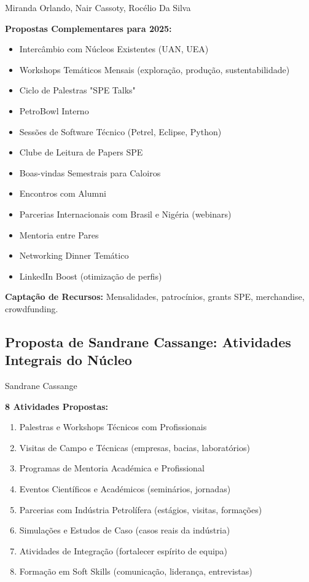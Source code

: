 \documentclass[12pt,a4paper,oneside]{article}
\begin{document}
\begin{proposalbox}{Miranda Orlando, Nair Cassoty, Rocélio Da Silva}

\textbf{Propostas Complementares para 2025:}

\begin{itemize}[label={\color{spe-secondary}▸}]
  \item Intercâmbio com Núcleos Existentes (UAN, UEA)
  \item Workshops Temáticos Mensais (exploração, produção, sustentabilidade)
  \item Ciclo de Palestras "SPE Talks"
  \item PetroBowl Interno
  \item Sessões de Software Técnico (Petrel, Eclipse, Python)
  \item Clube de Leitura de Papers SPE
  \item Boas-vindas Semestrais para Caloiros
  \item Encontros com Alumni
  \item Parcerias Internacionais com Brasil e Nigéria (webinars)
  \item Mentoria entre Pares
  \item Networking Dinner Temático
  \item LinkedIn Boost (otimização de perfis)
\end{itemize}

\textbf{Captação de Recursos:} Mensalidades, patrocínios, grants SPE, merchandise, crowdfunding.

\end{proposalbox}

\vspace{1.2cm}

\subsection{Proposta de Sandrane Cassange: Atividades Integrais do Núcleo}

\begin{proposalbox}{Sandrane Cassange}

\textbf{8 Atividades Propostas:}

\begin{enumerate}
  \item Palestras e Workshops Técnicos com Profissionais
  \item Visitas de Campo e Técnicas (empresas, bacias, laboratórios)
  \item Programas de Mentoria Académica e Profissional
  \item Eventos Científicos e Académicos (seminários, jornadas)
  \item Parcerias com Indústria Petrolífera (estágios, visitas, formações)
  \item Simulações e Estudos de Caso (casos reais da indústria)
  \item Atividades de Integração (fortalecer espírito de equipa)
  \item Formação em Soft Skills (comunicação, liderança, entrevistas)
\end{enumerate}

\end{proposalbox}
\end{document}

